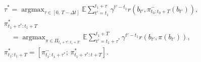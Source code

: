 \documentclass[letterpaper]{article} %
\newcommand{\argmax}{\mathop{\mathrm{argmax}}}
\begin{document}
%
%
%
%
\begin{align}
  & \tau^* = \argmax_{\tau \in [0,\, T-\Delta t]} \mathbb{E} \sum_{t'=t_1}^{t_1+\tau} \gamma^{t'-t_1} r(b_{t'}, \pi_{t_0:t_0+T}^-(b_{t'})),
  \label{eq:resiliency_tau}
  \\
  & \pi_{t_1+\tau^*:t_1+T}^* \nonumber \\
  & \quad= \argmax_{\pi \in \Pi_{t_1+\tau^*:t_1+T}} \, \mathbb{E} \sum_{t'=t_1+\tau^*}^{t_1+T} \gamma^{t'-t_1} r(b_{t'}, \pi(b_{t'})),
  \label{eq:resiliency_pi}
  \\
  & \pi_{t_1:t_1+T}^* = [\pi_{t_1:t_1+\tau^*}^-; \, \pi_{t_1+\tau^*:t+T}^*].
  \label{eq:concatenated_pi}
\end{align}
\end{document}
